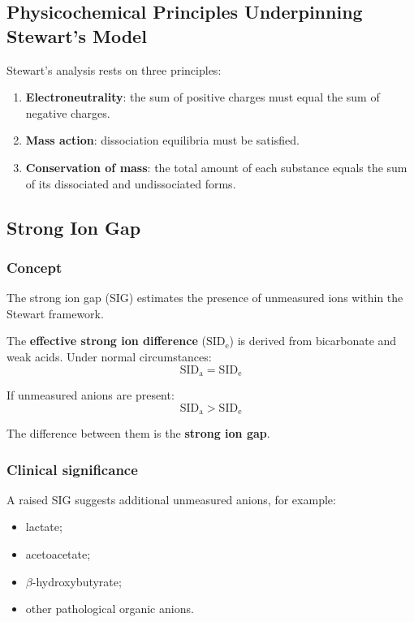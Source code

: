 \documentclass[11pt,a4paper]{article}
\begin{document}
\subsection{Physicochemical Principles Underpinning Stewart's Model}

Stewart's analysis rests on three principles:
\begin{enumerate}[label=\arabic*.]
    \item \textbf{Electroneutrality}: the sum of positive charges must equal the sum of negative charges.
    \item \textbf{Mass action}: dissociation equilibria must be satisfied.
    \item \textbf{Conservation of mass}: the total amount of each substance equals the sum of its dissociated and undissociated forms.
\end{enumerate}

\subsection{Strong Ion Gap}

\subsubsection{Concept}

The strong ion gap (SIG) estimates the presence of unmeasured ions within the Stewart framework.

The \textbf{effective strong ion difference} (\(\mathrm{SID_e}\)) is derived from bicarbonate and weak acids. Under normal circumstances:
\[
\mathrm{SID_a} = \mathrm{SID_e}
\]

If unmeasured anions are present:
\[
\mathrm{SID_a} > \mathrm{SID_e}
\]

The difference between them is the \textbf{strong ion gap}.

\subsubsection{Clinical significance}

A raised SIG suggests additional unmeasured anions, for example:
\begin{itemize}
    \item lactate;
    \item acetoacetate;
    \item \(\beta\)-hydroxybutyrate;
    \item other pathological organic anions.
\end{itemize}
\end{document}
